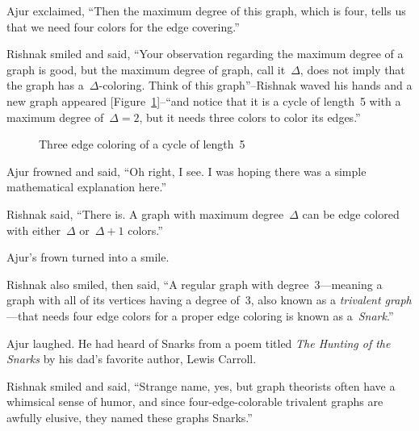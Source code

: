 Ajur exclaimed, ``Then the maximum degree of this graph, which is four, tells us that we need four colors for the edge covering.''

Rishnak smiled and said, ``Your observation regarding the maximum degree of a graph is good, but the maximum degree of graph, call it~$\Delta$, does not imply that the graph has a~$\Delta$-coloring. Think of this graph''--Rishnak waved his hands and a new graph appeared [Figure~\ref{10g6}]--``and notice that it is a cycle of length~5 with a maximum degree of~$\Delta=2$, but it needs three colors to color its edges.''

\begin{figure}
\begin{center}


\caption{Three edge coloring of a cycle of length~5}\label{10g6}
\end{center}
\end{figure}

Ajur frowned and said, ``Oh right, I see. I was hoping there was a simple mathematical explanation here.''

Rishnak said, ``There is. A graph with maximum degree~$\Delta$ can be edge colored with either~$\Delta$ or~$\Delta+1$ colors.''

Ajur's frown turned into a smile.

Rishnak also smiled, then said, ``A regular graph with degree~3---meaning a graph with all of its vertices having a degree of~3, also known as a \textit{trivalent graph}---that needs four edge colors for a proper edge coloring is known as a~\textit{Snark}.''

Ajur laughed. He had heard of Snarks from a poem titled \textit{The Hunting of the Snarks} by his dad's favorite author, Lewis Carroll.

Rishnak smiled and said, ``Strange name, yes, but graph theorists often have a whimsical sense of humor, and since four-edge-colorable trivalent graphs are awfully elusive, they named these graphs Snarks.''

